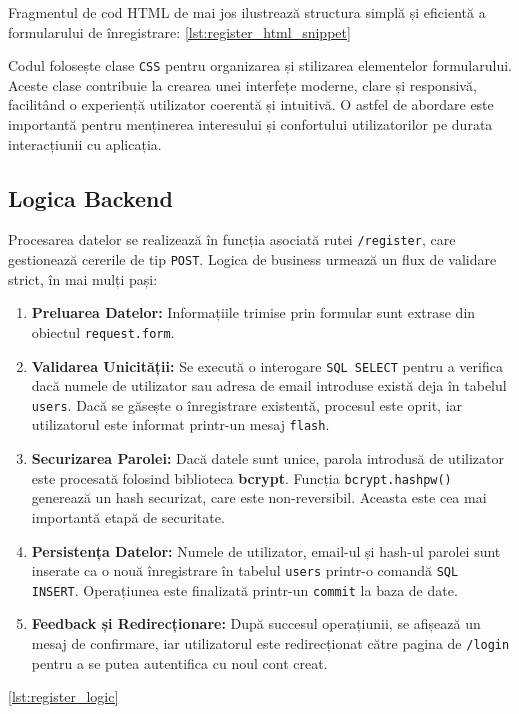 \documentclass[12pt, a4paper, oneside, romanian]{teza-upb}
\begin{document}
Fragmentul de cod HTML de mai jos ilustrează structura simplă și eficientă a formularului de înregistrare: \ref{lst:register_html_snippet}



Codul folosește clase \texttt{CSS} pentru organizarea și stilizarea elementelor formularului. Aceste clase contribuie la crearea unei interfețe moderne, clare și responsivă, facilitând o experiență utilizator coerentă și intuitivă. O astfel de abordare este importantă pentru menținerea interesului și confortului utilizatorilor pe durata interacțiunii cu aplicația.


\subsection*{Logica Backend}
Procesarea datelor se realizează în funcția asociată rutei \texttt{/register}, care gestionează cererile de tip \texttt{POST}. Logica de business urmează un flux de validare strict, în mai mulți pași:
\begin{enumerate}
	\item \textbf{Preluarea Datelor:} Informațiile trimise prin formular sunt extrase din obiectul \texttt{request.form}.
	\item \textbf{Validarea Unicității:} Se execută o interogare \texttt{SQL SELECT} pentru a verifica dacă numele de utilizator sau adresa de email introduse există deja în tabelul \texttt{users}. Dacă se găsește o înregistrare existentă, procesul este oprit, iar utilizatorul este informat printr-un mesaj \texttt{flash}.
	\item \textbf{Securizarea Parolei:} Dacă datele sunt unice, parola introdusă de utilizator este procesată folosind biblioteca \textbf{bcrypt}. Funcția \texttt{bcrypt.hashpw()} generează un hash securizat, care este non-reversibil. Aceasta este cea mai importantă etapă de securitate.
	\item \textbf{Persistența Datelor:} Numele de utilizator, email-ul și hash-ul parolei sunt inserate ca o nouă înregistrare în tabelul \texttt{users} printr-o comandă \texttt{SQL INSERT}. Operațiunea este finalizată printr-un \texttt{commit} la baza de date.
	\item \textbf{Feedback și Redirecționare:} După succesul operațiunii, se afișează un mesaj de confirmare, iar utilizatorul este redirecționat către pagina de \texttt{/login} pentru a se putea autentifica cu noul cont creat.
\end{enumerate} \ref{lst:register_logic}
\end{document}
